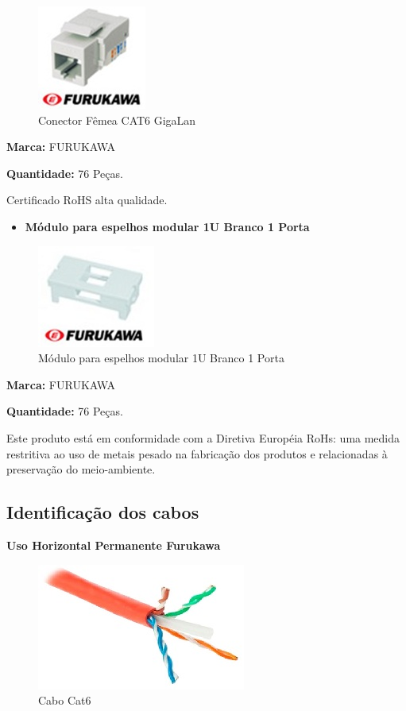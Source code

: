 \documentclass[	DIV=calc,%
							paper=a4,%
							fontsize=12pt,%
							onecolumn]{scrartcl}	 					%
\begin{document}
\begin{figure}
	\centering
	\caption{Conector Fêmea CAT6 GigaLan}
	\includegraphics{keystone1}
\end{figure}

\textbf{Marca:} FURUKAWA 

\textbf{Quantidade:} 76 Peças.

Certificado RoHS alta qualidade.

\begin{itemize}
	\item \textbf{Módulo para espelhos modular 1U Branco 1 Porta} 
\end{itemize}

\begin{figure}
	\centering
	\caption{Módulo para espelhos modular 1U Branco 1 Porta}
	\includegraphics{espelho1}
\end{figure}

\textbf{Marca:} FURUKAWA

\textbf{Quantidade:} 76 Peças.

Este produto está em conformidade com a Diretiva Européia RoHs: uma medida restritiva ao uso de metais pesado na fabricação dos produtos e relacionadas à preservação do meio-ambiente.

\subsection{Identificação dos cabos}

\textbf{Uso Horizontal Permanente Furukawa}

\begin{figure}[!h]
	\centering
	\caption{Cabo Cat6}
	\includegraphics{cabo_cat6_1}
\end{figure}
\end{document}

